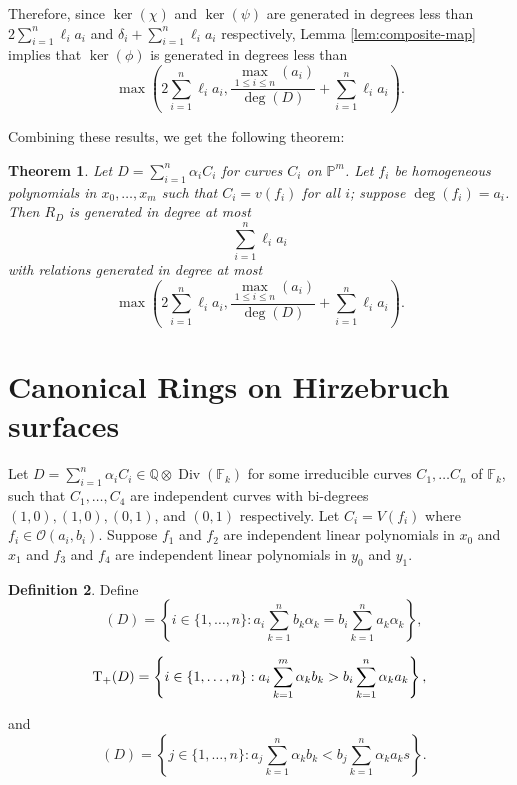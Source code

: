 \documentclass{amsart}
\theoremstyle{plain}
\newtheorem{thm}{Theorem}[section]
\theoremstyle{definition}
\newtheorem{defn}[thm]{Definition}
\theoremstyle{remark}
\numberwithin{equation}{section}
\DeclareMathOperator\di{Div}
\newcommand\bida{a}
\newcommand\bidb{b}
\newcommand\hirz{\mathbb{F}}
\DeclareMathOperator{\Te}{T_=}
\DeclareMathOperator{\Tp}{T_+}
\DeclareMathOperator{\Tm}{T_-}
\begin{document}
Therefore, since $\ker(\chi)$ and $\ker(\psi)$ are generated in degrees less than $2\sum_{i=1}^n \ell_i a_i$ and $\delta_i + \sum_{i=1}^n \ell_i a_i$ respectively, Lemma \ref{lem:composite-map} implies that $\ker(\phi)$ is generated in degrees less than
\[
	\max \left(2 \sum_{i=1}^n \ell_i a_i, \frac{\max_{1\le i \le n}(\bida_i)}{\deg(D)} + \sum_{i=1}^n \ell_i a_i \right).
\]

Combining these results, we get the following theorem:

\begin{thm}\label{P-m-generators/relations}
Let $D = \sum_{i=1}^n \alpha_i C_i$ for curves $C_i$ on $\mathbb{P}^m$.  Let $f_i$ be homogeneous polynomials in $x_0, \ldots, x_m$ such that $C_i = v(f_i)$ for all $i$; suppose $\deg(f_i) = a_i$. 
Then $R_D$ is generated in degree at most 
\[
	\sum_{i=1}^n \ell_i a_i
\]
with relations generated in degree at most
\[
	\max \left(2 \sum_{i=1}^n \ell_i a_i, \frac{\max_{1\le i \le n}(\bida_i)}{\deg(D)} + \sum_{i=1}^n \ell_i a_i \right).
\]
\end{thm}

\section{Canonical Rings on Hirzebruch surfaces}
Let $D=\sum_{i=1}^n \alpha_i C_i \in \mathbb{Q} \otimes \di(\hirz_
k)$ for some irreducible curves $C_1, \ldots C_n$ of $\hirz_k$, such
that $C_1, \ldots, C_4$ are independent curves with bi-degrees $(1,0)
, (1,0), (0,1)$, and $(0,1)$ respectively. Let $C_i = V(f_i)$ where
$f_i \in \mathscr{O}(\bida_i, \bidb_i)$.  Suppose $f_1$ and $f_2$ are independent linear
polynomials in $x_0$ and $x_1$ and $f_3$ and $f_4$ are independent
linear polynomials in $y_0$ and $y_1$.

\begin{defn}
Define 
\begin{equation}\label{eqn:define-T=(D)}
	\Te(D) = \left\{i \in \{1, \ldots, n\}: \bida_i \sum_{k=1}^n \bidb_k 
\alpha_k = \bidb_i \sum_{k=1}^n \bida_k \alpha_k \right\},
\end{equation}

\begin{equation}\label{eqn:define-T+(D)}
	\Tp(D) = \left\{ i \in \{1, \ldots, n\}:  \vphantom{\sum_{k=1}^n} 
\bida_i \sum_{k=1}^m \alpha_k \bidb_k > \bidb_i \sum_{k=1}^n \alpha_k \bida_k 
\right\},
\end{equation}

\noindent
and
\begin{equation}\label{eqn:define-T-(D)}
	\Tm(D) = \left\{ j \in \{1, \ldots, n\}: \bida_j \sum_{k=1}^n \alpha_
k \bidb_k < \bidb_j \sum_{k=1}^n \alpha_k \bida_k s \right\}.
\end{equation}
\end{defn}
\end{document}
